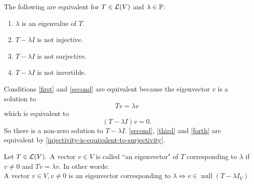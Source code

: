 \setcounter{thm}{6}
\begin{thm}
  \label{equivalent-conditions-to-be-an-eigenvalue}
  The following are equivalent for $T \in \mathcal{L}(V)$ and $\lambda \in \mathbb{F}$:
  \begin{enumerate}[label=(\alph*)]
    \item $\lambda$ is an eigenvalue of $T$. \label{first}
    \item $T-\lambda I$ is not injective. \label{second}
    \item $T-\lambda I$ is not surjective. \label{third}
    \item $T-\lambda I$ is not invertible. \label{forth}
  \end{enumerate}
\end{thm}
\begin{prf}
  Conditions \ref{first} and \ref{second} are equivalent because the eigenvector $v$ is a solution to 
  \begin{equation}
    Tv=\lambda v
  \end{equation} which is equivalent to 
  \begin{equation}
    (T-\lambda I)v=0.
  \end{equation} So there is a non-zero solution to $T-\lambda I$.
  \ref{second}, \ref{third} and \ref{forth} are equivalent by \ref{injectivity-is-equivalent-to-surjectivity}.
  
\end{prf}

\setcounter{thm}{7}
\begin{mydef}
  Let $T\in \mathcal{L}(V).$ A vector $v \in V$ is called ``an eigenvector" of $T$ corresponding to $\lambda$ if $v\neq 0$ and $Tv = \lambda v$.
  In other words:
  \\A vector $v\in V, v \neq 0$ is an eigenvector corresponding to $\lambda \iff v \in \operatorname{null}(T-\lambda I_V)$
\end{mydef}

